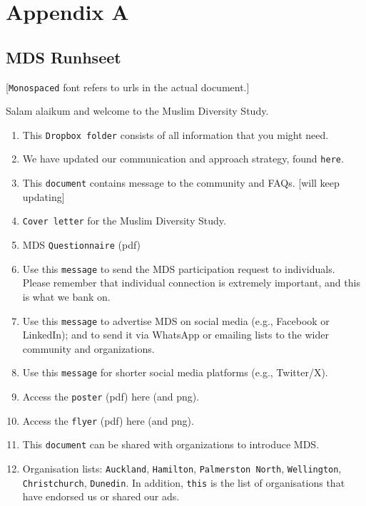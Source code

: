 \documentclass[
]{interact}
\providecommand{\tightlist}{%
  \setlength{\itemsep}{0pt}\setlength{\parskip}{0pt}}\usepackage{longtable,booktabs,array}
\begin{document}
\newpage{}

\section{Appendix A}\label{appendix-a}

\subsection{MDS Runhseet}\label{mds-runhseet}

{[}\texttt{Monospaced} font refers to urls in the actual document.{]}

\noindent Salam alaikum and welcome to the Muslim Diversity Study.

\begin{enumerate}
\def\labelenumi{\arabic{enumi}.}
\tightlist
\item
  This \texttt{Dropbox\ folder} consists of all information that you
  might need.
\item
  We have updated our communication and approach strategy, found
  \texttt{here}.
\item
  This \texttt{document} contains message to the community and FAQs.
  {[}will keep updating{]}
\item
  \texttt{Cover\ letter} for the Muslim Diversity Study.
\item
  MDS \texttt{Questionnaire} (pdf)
\item
  Use this \texttt{message} to send the MDS participation request to
  individuals. Please remember that individual connection is extremely
  important, and this is what we bank on.
\item
  Use this \texttt{message} to advertise MDS on social media (e.g.,
  Facebook or LinkedIn); and to send it via WhatsApp or emailing lists
  to the wider community and organizations.
\item
  Use this \texttt{message} for shorter social media platforms (e.g.,
  Twitter/X).
\item
  Access the \texttt{poster} (pdf) here (and png).
\item
  Access the \texttt{flyer} (pdf) here (and png).
\item
  This \texttt{document} can be shared with organizations to introduce
  MDS.
\item
  Organisation lists: \texttt{Auckland}, \texttt{Hamilton},
  \texttt{Palmerston\ North}, \texttt{Wellington},
  \texttt{Christchurch}, \texttt{Dunedin}. In addition, \texttt{this} is
  the list of organisations that have endorsed us or shared our ads.

\end{enumerate}
\end{document}
